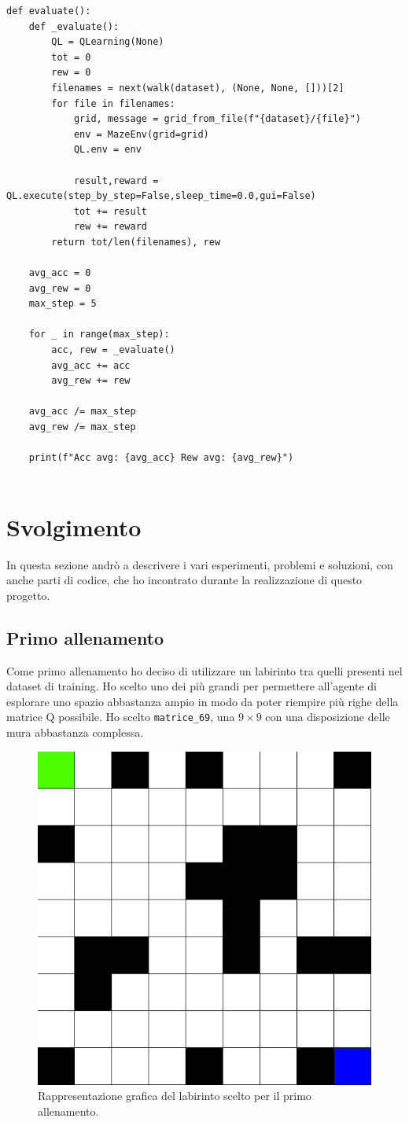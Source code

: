 \begin{lstlisting}[style=python, caption={Funzione per la valutazione dell'apprendimento}]
def evaluate():
	def _evaluate():
		QL = QLearning(None)
		tot = 0
		rew = 0
		filenames = next(walk(dataset), (None, None, []))[2]
		for file in filenames:
			grid, message = grid_from_file(f"{dataset}/{file}")
			env = MazeEnv(grid=grid)
			QL.env = env
			
			result,reward = QL.execute(step_by_step=False,sleep_time=0.0,gui=False)
			tot += result
			rew += reward
		return tot/len(filenames), rew

	avg_acc = 0
	avg_rew = 0
	max_step = 5
	
	for _ in range(max_step):
		acc, rew = _evaluate()
		avg_acc += acc
		avg_rew += rew
	
	avg_acc /= max_step
	avg_rew /= max_step
	
	print(f"Acc avg: {avg_acc} Rew avg: {avg_rew}")
	
\end{lstlisting}

\section{Svolgimento}

In questa sezione andr\`{o} a descrivere i vari esperimenti, problemi e soluzioni, con anche parti di codice, che ho incontrato durante la realizzazione di questo progetto.

\subsection{Primo allenamento}
\label{sec:primoallenamento}

Come primo allenamento ho deciso di utilizzare un labirinto tra quelli presenti nel dataset di training. Ho scelto uno dei pi\`{u} grandi per permettere all'agente di esplorare uno spazio abbastanza ampio in modo da poter riempire pi\`{u} righe della matrice Q possibile. Ho scelto \lstinline[style=cmd]|matrice_69|, una $9 \times 9$ con una disposizione delle mura abbastanza complessa.

\begin{figure}[H]
	\centering
	\includegraphics[width=.3\textwidth]{img/matrice_69.png}
	\caption{Rappresentazione grafica del labirinto scelto per il primo allenamento.}
\end{figure}

